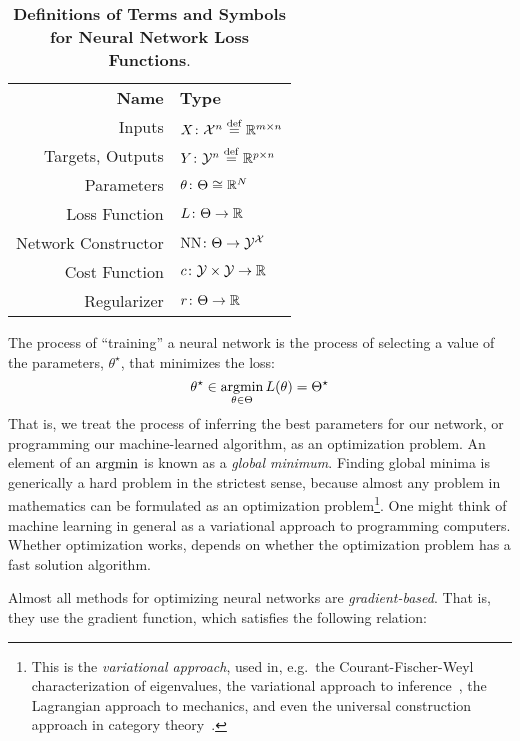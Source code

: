 \documentclass[../../thesis.tex]{subfiles}
\begin{document}
\begin{table}[h]
	\begin{center}
		\begin{tabular}{rl}
			\textbf{Name}       & \textbf{Type}                          \\
			Inputs              & $X \colon {\mathcal{X}}^n \stackrel{\small \mathrm{def}}{=} \mathbb{R}^{m\times n}$  \\
			Targets, Outputs    & $Y \colon {\mathcal{Y}}^n \stackrel{\small \mathrm{def}}{=} \mathbb{R}^{p\times n}$  \\
			Parameters          & $\theta \colon \Theta \cong \mathbb{R}^N$        \\
			Loss Function       & $L \colon \Theta \to \mathbb{R}$                \\
			Network Constructor & $\mathrm{NN} \colon \Theta \to {\mathcal{Y}}^{\mathcal{X}}$ \\
			Cost Function       & $c \colon {\mathcal{Y}} \times {\mathcal{Y}} \to \mathbb{R}$        \\
			Regularizer         & $r \colon \Theta \to \mathbb{R}$
		\end{tabular}
	\end{center}
	\caption{\textbf{Definitions of Terms and Symbols for Neural Network Loss Functions}.}
\end{table}

The process of \enquote{training} a neural network is the process
of selecting a value of the parameters, $\theta^\star$, that minimizes the loss:
\begin{equation}\equationlabel{minimize}
	\theta^\star \in \argmin_{\theta \in \Theta} L(\theta) = \Theta^\star
\end{equation}
That is, we treat the process of inferring the best parameters for our network,
or programming our machine-learned algorithm,
as an optimization problem.
An element of an $\mathop{\mathrm{argmin}}$ is known as a \emph{global minimum}.
Finding global minima is generically a hard problem in the strictest sense,
because almost any problem in mathematics can be formulated as an
optimization problem\footnote{This is the \emph{variational approach},
used in, e.g.~the Courant-Fischer-Weyl characterization of eigenvalues,
the variational approach to inference~\cite{wainwright2007},
the Lagrangian approach to mechanics,
and even the universal construction approach in category theory~\cite{milewski2014}.
}.
One might think of machine learning in general as
a variational approach to programming computers.
Whether optimization works,
depends on whether the optimization problem
has a fast solution algorithm.

Almost all methods for optimizing neural networks
are \emph{gradient-based}.
That is, they use the gradient function,
which satisfies the following relation:
\end{document}
